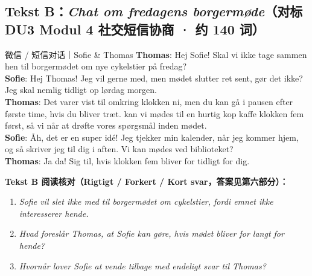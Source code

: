 \subsection*{Tekst B：\textit{Chat om fredagens borgermøde}（对标 DU3 Modul 4 社交短信协商 · 约 140 词）}

\begin{emailbox}{微信 / 短信对话｜Sofie \& Thomas}
\textbf{Thomas}: Hej Sofie! Skal vi ikke tage sammen hen til borgermødet om nye cykelstier på fredag?\\[3pt]
\textbf{Sofie}: Hej Thomas! Jeg vil  gerne med, men mødet slutter  ret sent, gør det ikke? Jeg skal nemlig tidligt op lørdag morgen.\\[3pt]
\textbf{Thomas}: Det varer vist til omkring klokken ni, men du kan  gå i pausen efter første time, hvis du bliver træt.  kan vi  mødes til en hurtig kop kaffe klokken fem først, så vi når at drøfte vores spørgsmål inden mødet.\\[3pt]
\textbf{Sofie}: Åh, det er en super idé! Jeg tjekker  min kalender, når jeg kommer hjem, og så skriver jeg til dig i aften. Vi kan  mødes ved biblioteket?\\[3pt]
\textbf{Thomas}: Ja da! Sig  til, hvis klokken fem bliver for tidligt for dig.
\end{emailbox}

\textbf{Tekst B 阅读核对（Rigtigt / Forkert / Kort svar，答案见第六部分）：}
\begin{enumerate}
  \item \textit{Sofie vil slet ikke med til borgermødet om cykelstier, fordi emnet ikke interesserer hende.} \underline{\hspace{2.2cm}}
  \item \textit{Hvad foreslår Thomas, at Sofie kan gøre, hvis mødet bliver for langt for hende?} \\\underline{\hspace{5.2cm}}
  \item \textit{Hvornår lover Sofie at vende tilbage med endeligt svar til Thomas?} \underline{\hspace{4.5cm}}
\end{enumerate}

